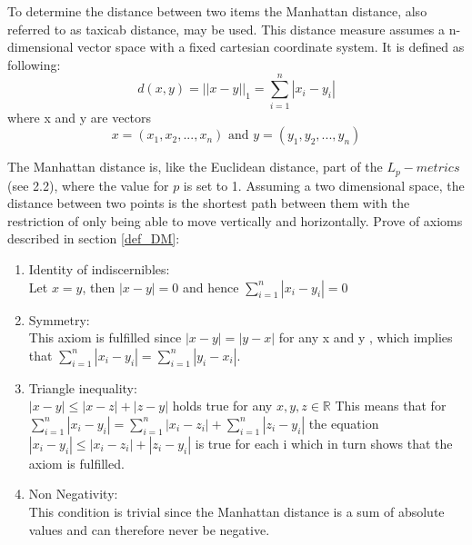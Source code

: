 To determine the distance between two items the Manhattan distance, also referred to as taxicab distance, may be used. This distance measure assumes a n-dimensional vector space with a fixed cartesian coordinate system. It is defined as following: \cite{Craw2010}
$$d(x,y)= ||x-y||_1 = \sum\limits_{i=1}^{n}|x_i - y_i|$$
where x and y are vectors
$$x = (x_1, x_2,..., x_n) \text{ and } y = (y_1, y_2,..., y_n)$$

The Manhattan distance is, like the Euclidean distance, part of the $L_p-metrics$ (see 2.2), where the value for $p$ is set to 1.
Assuming a two dimensional space, the distance between two points is the shortest path between them with the restriction of only being able to move vertically and horizontally.
Prove of axioms described in section \ref{def_DM}:\\
\begin{enumerate}
	\item Identity of indiscernibles:\\
	Let $x=y$, then $|x-y| = 0$ and hence $\sum\limits_{i=1}^{n}|x_i - y_i| = 0$
	\item Symmetry:\\
	This axiom is fulfilled since $|x-y| = |y-x|$ for any x and y , which implies that $\sum\limits_{i=1}^{n}|x_i - y_i| = \sum\limits_{i=1}^{n}|y_i - x_i|$.
	\item Triangle inequality:\\
	$|x-y| \leq |x-z|+|z-y|$ holds true for any $x,y,z \in \mathbb{R}$
	This means that for $\sum\limits_{i=1}^{n}|x_i - y_i| = \sum\limits_{i=1}^{n}|x_i - z_i| + \sum\limits_{i=1}^{n}|z_i - y_i|$ the equation $|x_i - y_i| \leq |x_i - z_i| + |z_i - y_i|$ is true for each i which in turn shows that the axiom is fulfilled.
	\item Non Negativity:\\
	This condition is trivial since the Manhattan distance is a sum of absolute values and can therefore never be negative.
\end{enumerate}